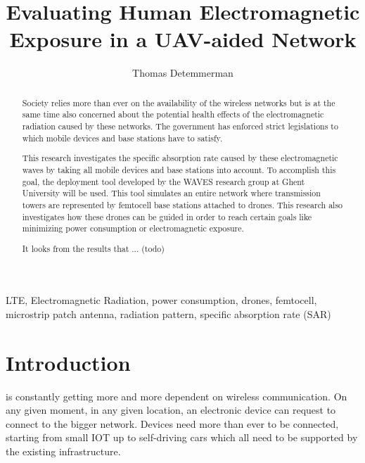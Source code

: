 \documentclass[twocolumn]{phdsymp} %
\begin{document}
\title{Evaluating Human Electromagnetic Exposure in a \gls{UAV}-aided Network}

\author{Thomas Detemmerman}


\maketitle

\begin{abstract}
Society relies more than ever on the availability of the wireless networks but is at the same time also 
concerned about the potential health effects of the electromagnetic radiation caused by these networks.
The government has enforced strict legislations to which mobile devices and base stations have to satisfy.

This research investigates the specific absorption rate caused by these electromagnetic waves by taking all mobile devices and base stations into account.
To accomplish this goal, the deployment tool developed by the WAVES research group at Ghent University will be used. This tool simulates an entire network 
where transmission towers are represented by femtocell base stations attached to drones. This research also investigates how these drones can be guided 
in order to reach certain goals like minimizing power consumption or electromagnetic exposure.

It looks from the results that ... (todo)
\end{abstract}

\begin{keywords}
LTE, Electromagnetic Radiation, power consumption, drones, femtocell, microstrip patch antenna, radiation pattern, specific absorption rate (SAR)
\end{keywords}

\section{Introduction}
 is constantly getting more and more dependent on wireless communication. 
On any given moment, in any given location, an electronic device
can request to connect to the bigger network. Devices need more than ever to be connected, 
starting from small \gls{IOT} up to self-driving cars
which all need to be supported by the existing infrastructure. 
\end{document}
